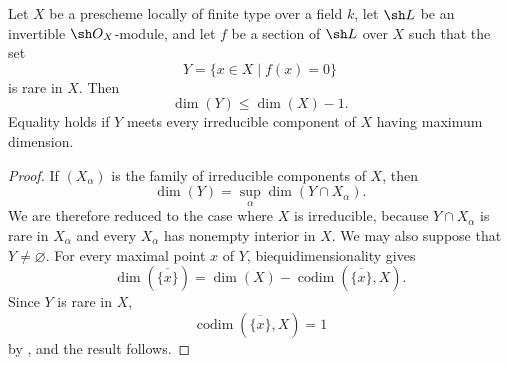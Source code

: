 \begin{corollary}[5.2.4]
\label{IV.5.2.4}
Let $X$ be a prescheme locally of finite type over a field $k$, let
$\sh L$ be an invertible $\sh O_X$-module, and let $f$ be a section
of $\sh L$ over $X$ such that the set
\[
Y=\{x\in X\mid f(x)=0\}
\]
is rare in $X$.
Then
\[
\dim(Y)\leq\dim(X)-1.
\]
Equality holds if $Y$ meets every irreducible component of $X$ having
maximum dimension.
\end{corollary}

\begin{proof}
If $(X_\alpha)$ is the family of irreducible components of $X$, then
\[
\dim(Y)=\sup_\alpha\dim(Y\cap X_\alpha).
\]
We are therefore reduced to the case where $X$ is irreducible,
because $Y\cap X_\alpha$ is rare in $X_\alpha$ and every
$X_\alpha$ has nonempty interior in $X$.
We may also suppose that $Y\ne\varnothing$.
For every maximal point $x$ of $Y$, biequidimensionality gives
\[
\dim(\overline{\{x\}})
  =\dim(X)-\operatorname{codim}(\overline{\{x\}},X).
\]
Since $Y$ is rare in $X$,
\[
\operatorname{codim}(\overline{\{x\}},X)=1
\]
by , and the result follows.
\end{proof}

